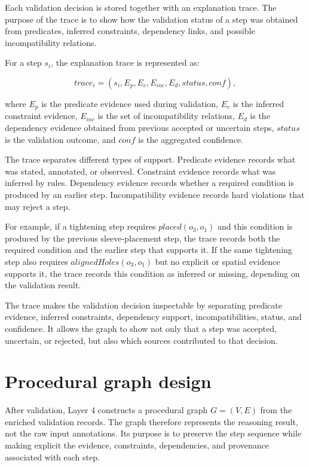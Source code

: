 Each validation decision is stored together with an explanation trace. The purpose of the trace is to show how the validation status of a step was obtained from predicates, inferred constraints, dependency links, and possible incompatibility relations.

For a step $s_i$, the explanation trace is represented as:

\[
trace_i = (s_i, E_p, E_c, E_{inc}, E_d, status, conf),
\]

where $E_p$ is the predicate evidence used during validation, $E_c$ is the inferred constraint evidence, $E_{inc}$ is the set of incompatibility relations, $E_d$ is the dependency evidence obtained from previous accepted or uncertain steps, $status$ is the validation outcome, and $conf$ is the aggregated confidence.

The trace separates different types of support. Predicate evidence records what was stated, annotated, or observed. Constraint evidence records what was inferred by rules. Dependency evidence records whether a required condition is produced by an earlier step. Incompatibility evidence records hard violations that may reject a step.

For example, if a tightening step requires $placed(o_3,o_1)$ and this condition is produced by the previous sleeve-placement step, the trace records both the required condition and the earlier step that supports it. If the same tightening step also requires $alignedHoles(o_3,o_1)$ but no explicit or spatial evidence supports it, the trace records this condition as inferred or missing, depending on the validation result.

The trace makes the validation decision inspectable by separating predicate evidence, inferred constraints, dependency support, incompatibilities, status, and confidence. It allows the graph to show not only that a step was accepted, uncertain, or rejected, but also which sources contributed to that decision.


\section{Procedural graph design}
\label{sec:procedural-graph-design}

After validation, Layer 4 constructs a procedural graph $G=(V,E)$ from the enriched validation records. The graph therefore represents the reasoning result, not the raw input annotations. Its purpose is to preserve the step sequence while making explicit the evidence, constraints, dependencies, and provenance associated with each step.

